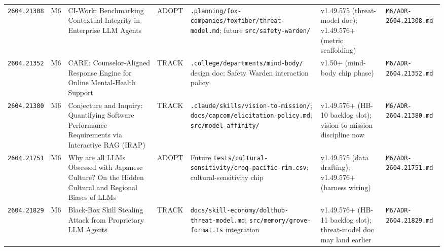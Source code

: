 \documentclass[11pt,letterpaper]{article}
\newcommand{\arxivid}[1]{\texttt{\textcolor{accent}{#1}}}
\begin{document}
\begin{footnotesize}
\begin{longtable}{@{}L{0.10\textwidth} L{0.025\textwidth} L{0.22\textwidth} L{0.06\textwidth} L{0.20\textwidth} L{0.13\textwidth} L{0.13\textwidth}@{}}
\arxivid{2604.21308} & M6 & CI-Work: Benchmarking Contextual Integrity in Enterprise LLM Agents & ADOPT & \texttt{.planning/fox-companies/foxfiber/threat-model.md}; future \texttt{src/safety-warden/} & v1.49.575 (threat-model doc); v1.49.576+ (metric scaffolding) & \texttt{\small M6/ADR-2604.21308.md} \\
\arxivid{2604.21352} & M6 & CARE: Counselor-Aligned Response Engine for Online Mental-Health Support & TRACK & \texttt{.college/departments/mind-body/} design doc; Safety Warden interaction policy & v1.50+ (mind-body chip phase) & \texttt{\small M6/ADR-2604.21352.md} \\
\arxivid{2604.21380} & M6 & Conjecture and Inquiry: Quantifying Software Performance Requirements via Interactive RAG (IRAP) & TRACK & \texttt{.claude/skills/vision-to-mission/}; \texttt{docs/capcom/elicitation-policy.md}; \texttt{src/model-affinity/} & v1.49.576+ (HB-10 backlog slot); vision-to-mission discipline now & \texttt{\small M6/ADR-2604.21380.md} \\
\arxivid{2604.21751} & M6 & Why are all LLMs Obsessed with Japanese Culture? On the Hidden Cultural and Regional Biases of LLMs & ADOPT & Future \texttt{tests/cultural-sensitivity/croq-pacific-rim.csv}; cultural-sensitivity chip & v1.49.575 (data drafting); v1.49.576+ (harness wiring) & \texttt{\small M6/ADR-2604.21751.md} \\
\arxivid{2604.21829} & M6 & Black-Box Skill Stealing Attack from Proprietary LLM Agents & TRACK & \texttt{docs/skill-economy/dolthub-threat-model.md}; \texttt{src/memory/grove-format.ts} integration & v1.49.576+ (HB-11 backlog slot); threat-model doc may land earlier & \texttt{\small M6/ADR-2604.21829.md} \\
\end{longtable}
\end{footnotesize}
\end{document}
